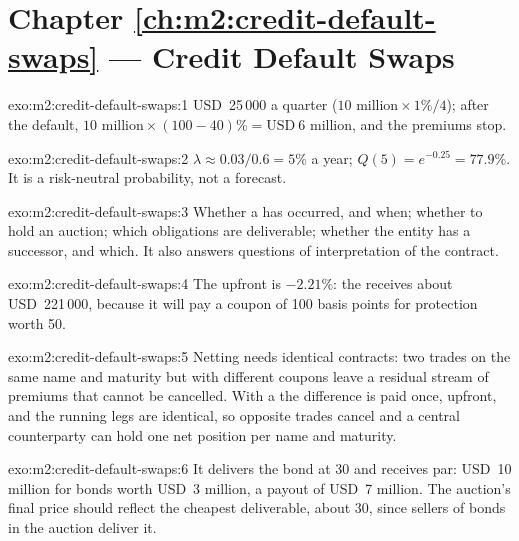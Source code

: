 \section*{Chapter \ref{ch:m2:credit-default-swaps} --- Credit Default Swaps}

\begin{solution}{exo:m2:credit-default-swaps:1}
USD~25\,000 a quarter ($10 \text{ million} \times 1\% / 4$); after the default, $10
\text{ million} \times (100 - 40)\% = \text{USD}~6$ million, and the premiums stop.
\end{solution}

\begin{solution}{exo:m2:credit-default-swaps:2}
$\lambda \approx 0.03 / 0.6 = 5\%$ a year; $Q(5) = e^{-0.25} = 77.9\%$. It is a
risk-neutral probability, not a forecast.
\end{solution}

\begin{solution}{exo:m2:credit-default-swaps:3}
Whether a  has occurred, and when; whether to hold an auction; which
obligations are deliverable; whether the entity has a successor, and which. It also
answers questions of interpretation of the contract.
\end{solution}

\begin{solution}{exo:m2:credit-default-swaps:4}
The upfront is $-2.21\%$: the  receives about USD~221\,000, because it
will pay a coupon of 100 basis points for protection worth 50.
\end{solution}

\begin{solution}{exo:m2:credit-default-swaps:5}
Netting needs identical contracts: two trades on the same name and maturity but with
different coupons leave a residual stream of premiums that cannot be cancelled. With a
 the difference is paid once, upfront, and the running legs are
identical, so opposite trades cancel and a central counterparty can hold one net
position per name and maturity.
\end{solution}

\begin{solution}{exo:m2:credit-default-swaps:6}
It delivers the bond at 30 and receives par: USD~10 million for bonds worth USD~3
million, a payout of USD~7 million. The auction's final price should reflect the
cheapest deliverable, about 30, since sellers of bonds in the auction deliver it.
\end{solution}

